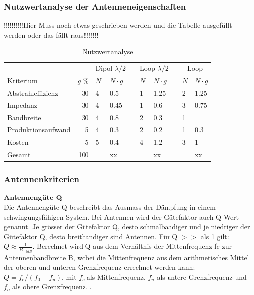 \subsubsection{Nutzwertanalyse der Antenneneigenschaften }
!!!!!!!!!!Hier Muss noch etwas geschrieben werden und die Tabelle ausgefüllt werden oder das fällt raus!!!!!!!!
\begin{table}[!ht]
 \centering
 \begin{tabular}{l r l l l l l l l l} \toprule 
 && \multicolumn{2}{c}{Dipol $\lambda/2$} && \multicolumn{2}{c}{Loop $\lambda/2$} && \multicolumn{2}{c}{Loop} \\ \cmidrule{3-4} \cmidrule{6-7} \cmidrule{9-10}
 	Kriterium 	& $g$ \% 		& $N$ & $N\cdot g$ 	&& $N$ & $N\cdot g$ 		&& $N$ 	& $N\cdot g$ \\ \midrule
 	Abstrahleffizienz	& 	30 	& 4 & 0.5 	&& 1 & 1.25 && 2 	& 1.25 \\
 	Impedanz 			& 	30 	& 4 & 0.45 	&& 1 & 0.6 	&& 3 	& 0.75 \\
	Bandbreite 			&	30	& 4 	& 0.8 	&& 2 & 0.3 	&& 1		&	\\
 	Produktionsaufwand 	& 	5 	& 4 & 0.3 	&& 2 & 0.2 	&& 1 	& 0.3 \\
 	Kosten 				& 	5 	& 5 & 0.4 	&& 4 & 1.2 	&& 3 	& 1 \\
 \hline
 Gesamt 					& 100 	& & xx 	&& & xx && 	& xx \\ \bottomrule
 \end{tabular}
 \caption{Nutzwertanalyse }
 \label{nutzwertEvaluation}
\end{table}


\subsubsection{Antennenkriterien}
\textbf{Antennengüte Q}\\
Die Antennengüte Q beschreibt das Ausmass der Dämpfung in einem schwingungsfähigen System. Bei Antennen wird der Gütefaktor auch Q Wert genannt. Je grösser der Gütefaktor Q, desto schmalbandiger und je niedriger der Gütefaktor Q, desto breitbandiger sind Antennen. Für Q  $>>$ als 1 gilt: $Q \approx\frac{1}{B_{-3dB}}$. Berechnet wird Q aus dem Verhältnis der Mittenfrequenz fc zur Antennenbandbreite B, wobei die Mittenfrequenz aus dem arithmetisches Mittel der oberen und unteren Grenzfrequenz errechnet werden kann: $Q = f_c/(f_0-f_u)$, mit $f_c$ als Mittenfrequenz, $f_u$ als untere Grenzfrequenz und $f_o$ als obere Grenzfrequenz. \cite{Guetefaktor_Q}.\\

